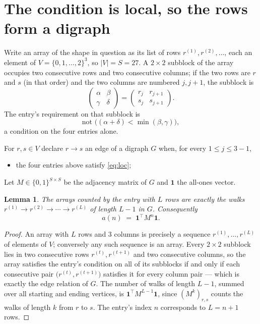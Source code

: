 \documentclass[11pt,a4paper]{article}
\theoremstyle{plain}
\newtheorem{lemma}[theorem]{Lemma}
\theoremstyle{definition}
\begin{document}
\section{The condition is local, so the rows form a digraph}

Write an array of the shape in question as its list of rows
$r^{(1)},r^{(2)},\dots$, each an element of
$V=\{0,1,\dots,2\}^{3}$, so $|V|=S=27$. A $2\times2$ subblock of the array
occupies two consecutive rows and two consecutive columns; if the two rows are $r$
and $s$ (in that order) and the two columns are numbered $j,j+1$,
the subblock is
\[
\begin{pmatrix}\alpha&\beta\\\gamma&\delta\end{pmatrix}=\begin{pmatrix}r_j&r_{j+1}\\s_j&s_{j+1}\end{pmatrix}.
\]
The entry's requirement on that subblock is
\begin{equation}\label{eq:loc}
\text{not }\bigl((\alpha+\delta)<\min(\beta,\gamma)\bigr),
\end{equation}
a condition on the four entries alone.

For $r,s\in V$ declare $r\to s$ an edge of a digraph $G$ when, for every
$1\le j\le 3-1$,
\begin{itemize}
\item the four entries above satisfy \eqref{eq:loc};

\end{itemize}
Let $M\in\{0,1\}^{S\times S}$ be the adjacency matrix of $G$ and $\mathbf{1}$ the
all-ones vector.

\begin{lemma}\label{lem:walk}
The arrays counted by the entry with $L$ rows are exactly the walks
$r^{(1)}\to r^{(2)}\to\cdots\to r^{(L)}$ of length $L-1$ in $G$. Consequently
\[
a(n)\;=\;\mathbf{1}^{\!\top}M^{n}\mathbf{1} .
\]
\end{lemma}

\begin{proof}
An array with $L$ rows and $3$ columns is precisely a sequence
$r^{(1)},\dots,r^{(L)}$ of elements of $V$; conversely any such sequence is an array.
Every $2\times2$ subblock lies in two consecutive rows $r^{(t)},r^{(t+1)}$ and two
consecutive columns, so the array satisfies the entry's condition on all of its subblocks
if and only if each consecutive pair $\bigl(r^{(t)},r^{(t+1)}\bigr)$ satisfies it for
every column pair --- which is exactly the edge relation of $G$. The number of walks of
length $L-1$, summed over all starting and ending vertices, is
$\mathbf{1}^{\!\top}M^{L-1}\mathbf{1}$, since $(M^{k})_{r,s}$ counts the walks of
length $k$ from $r$ to $s$. The entry's index $n$ corresponds to $L=n+1$ rows.
\end{proof}
\end{document}
